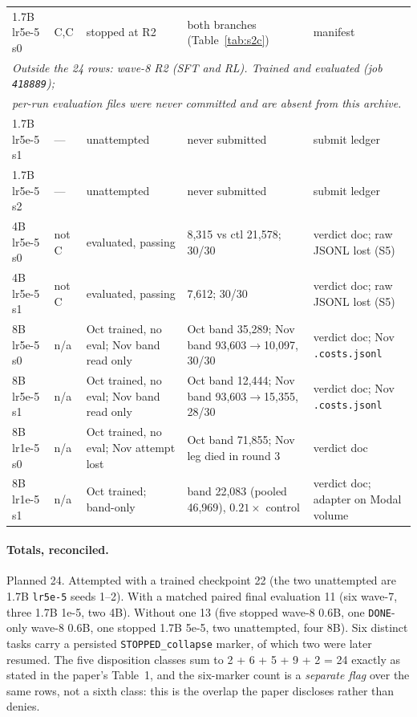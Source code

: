 \documentclass[11pt,a4paper]{article}
\begin{document}
\begin{table}[h]
\begin{tabular}{@{}p{2.35cm}p{2.0cm}p{2.6cm}p{3.5cm}p{3.2cm}@{}}
1.7B lr5e-5 s0 & C,C & stopped at R2 & both branches (Table~\ref{tab:s2c}) & manifest \\
\multicolumn{5}{l}{\emph{Outside the 24 rows: wave-8 R2 (SFT and RL). Trained and evaluated (job \texttt{418889});}} \\
\multicolumn{5}{l}{\emph{per-run evaluation files were never committed and are absent from this archive.}} \\
1.7B lr5e-5 s1 & --- & unattempted & never submitted & submit ledger \\
1.7B lr5e-5 s2 & --- & unattempted & never submitted & submit ledger \\
\midrule
4B lr5e-5 s0 & not C & evaluated, passing & 8{,}315 vs ctl 21{,}578; 30/30 & verdict doc; raw
JSONL lost (S5) \\
4B lr5e-5 s1 & not C & evaluated, passing & 7{,}612; 30/30 & verdict doc; raw JSONL lost (S5) \\
\midrule
8B lr5e-5 s0 & n/a & Oct trained, no eval; Nov band read only & Oct band 35{,}289; Nov band 93{,}603$\to$10{,}097, 30/30 & verdict doc; Nov \texttt{.costs.jsonl} \\
8B lr5e-5 s1 & n/a & Oct trained, no eval; Nov band read only & Oct band 12{,}444; Nov band 93{,}603$\to$15{,}355, 28/30 & verdict doc; Nov \texttt{.costs.jsonl} \\
8B lr1e-5 s0 & n/a & Oct trained, no eval; Nov attempt lost & Oct band 71{,}855; Nov leg died in round 3 & verdict doc \\
8B lr1e-5 s1 & n/a & Oct trained; band-only & band 22{,}083 (pooled 46{,}969), $0.21\times$ control & verdict doc; adapter on Modal volume \\
\bottomrule
\end{tabular}
\end{table}

\paragraph{Totals, reconciled.} Planned 24. Attempted with a trained checkpoint 22 (the two
unattempted are 1.7B \texttt{lr5e-5} seeds 1--2). With a matched paired final evaluation 11 (six
wave-7, three 1.7B 1e-5, two 4B). Without one 13 (five stopped wave-8 0.6B, one \texttt{DONE}-only
wave-8 0.6B, one stopped 1.7B 5e-5, two unattempted, four 8B). Six distinct tasks carry a persisted
\texttt{STOPPED\_collapse} marker, of which two were later resumed. The five disposition classes sum
to 2 + 6 + 5 + 9 + 2 = 24 exactly as stated in the paper's Table~1, and the six-marker count is a
\emph{separate flag} over the same rows, not a sixth class: this is the overlap the paper discloses
rather than denies.
\end{document}
